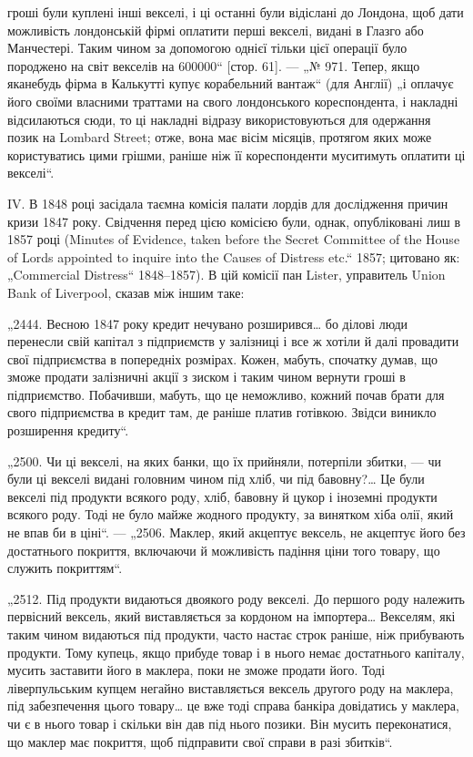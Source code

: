гроші були куплені інші векселі, і ці останні були відіслані до Лондона,
щоб дати можливість лондонській фірмі оплатити перші векселі, видані в Глазго
або Манчестері. Таким чином за допомогою однієї тільки цієї операції було породжено
на світ векселів на \num{600000}“ [стор. 61]. — „№ 971.
Тепер, якщо яканебудь фірма в Калькутті купує корабельний вантаж“ (для Англії)
„і оплачує його своїми власними траттами на свого лондонського кореспондента,
і накладні відсилаються сюди, то ці накладні відразу використовуються для одержання позик на Lombard
Street; отже, вона має вісім місяців, протягом яких
може користуватись цими грішми, раніше ніж її кореспонденти муситимуть
оплатити ці векселі“.

IV. В 1848 році засідала таємна комісія палати лордів для дослідження причин
кризи 1847 року. Свідчення перед цією комісією були, однак, опубліковані
лиш в 1857 році (Minutes of Evidence, taken before the Secret Committee of the
House of Lords appointed to inquire into the Causes of Distress etc.“ 1857; цитовано як: „Commercial
Distress“ 1848--1857). В цій комісії пан Lister, управитель
Union Bank of Liverpool, сказав між іншим таке:

„2444. Весною 1847 року кредит нечувано розширився\dots{} бо ділові люди
перенесли свій капітал з підприємств у залізниці і все ж хотіли й далі провадити свої підприємства в
попередніх розмірах. Кожен, мабуть, спочатку думав,
що зможе продати залізничні акції з зиском і таким чином вернути гроші в підприємство. Побачивши,
мабуть, що це неможливо, кожний почав брати для свого
підприємства в кредит там, де раніше платив готівкою. Звідси виникло розширення кредиту“.

„2500. Чи ці векселі, на яких банки, що їх прийняли, потерпіли збитки, — чи
були ці векселі видані головним чином під хліб, чи під бавовну?\dots{} Це були
векселі під продукти всякого роду, хліб, бавовну й цукор і іноземні продукти всякого роду. Тоді не
було майже жодного продукту, за винятком хіба
олії, який не впав би в ціні“. — „2506. Маклер, який акцептує вексель, не акцептує його без
достатнього покриття, включаючи й можливість падіння ціни того
товару, що служить покриттям“.

„2512. Під продукти видаються двоякого роду векселі. До першого роду належить первісний вексель,
який виставляється за кордоном на імпортера\dots{} Векселям,
які таким чином видаються під продукти, часто настає строк раніше, ніж прибувають продукти. Тому
купець, якщо прибуде товар і в нього немає достатнього
капіталу, мусить заставити його в маклера, поки не зможе продати його. Тоді
ліверпульським купцем негайно виставляється вексель другого роду на маклера,
під забезпечення цього товару\dots{} це вже тоді справа банкіра довідатись у маклера, чи є в нього товар
і скільки він дав під нього позики. Він мусить переконатися, що маклер має покриття, щоб підправити
свої справи в разі збитків“.

